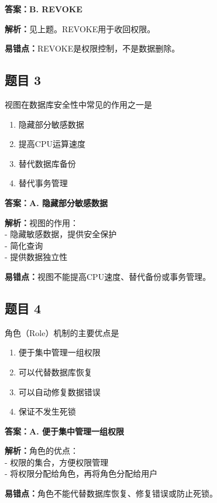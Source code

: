 \documentclass[12pt,a4paper]{ctexart}
\begin{document}
\begin{answerbox}
	\textbf{答案：B. REVOKE}

	\textbf{解析：}见上题。REVOKE用于收回权限。

	\textbf{易错点：}REVOKE是权限控制，不是数据删除。
\end{answerbox}

\subsection*{题目 3}
视图在数据库安全性中常见的作用之一是
\begin{enumerate}[label=\Alph*.]
	\item 隐藏部分敏感数据
	\item 提高CPU运算速度
	\item 替代数据库备份
	\item 替代事务管理
\end{enumerate}

\begin{answerbox}
	\textbf{答案：A. 隐藏部分敏感数据}

	\textbf{解析：}视图的作用：\\
	- 隐藏敏感数据，提供安全保护\\
	- 简化查询\\
	- 提供数据独立性

	\textbf{易错点：}视图不能提高CPU速度、替代备份或事务管理。
\end{answerbox}

\subsection*{题目 4}
角色（Role）机制的主要优点是
\begin{enumerate}[label=\Alph*.]
	\item 便于集中管理一组权限
	\item 可以代替数据库恢复
	\item 可以自动修复数据错误
	\item 保证不发生死锁
\end{enumerate}

\begin{answerbox}
	\textbf{答案：A. 便于集中管理一组权限}

	\textbf{解析：}角色的优点：\\
	- 权限的集合，方便权限管理\\
	- 将权限分配给角色，再将角色分配给用户

	\textbf{易错点：}角色不能代替数据库恢复、修复错误或防止死锁。
\end{answerbox}
\end{document}
